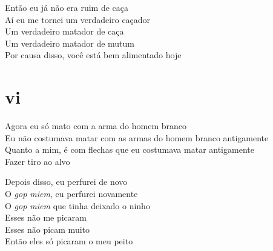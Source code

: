 \begin{linenumbers}\begingroup\raggedright
 
\noindent   Então eu já não era ruim de caça\\
  Aí eu me tornei um verdadeiro caçador\\
  Um verdadeiro matador de caça\\
  Um verdadeiro matador de mutum\\
  Por causa disso, você está bem alimentado hoje
 
 
\medskip
\section{vi}

  \noindent Agora eu só mato com a arma do homem branco\\
  Eu não costumava matar com as armas do homem branco antigamente\\
  Quanto a mim, é com flechas que eu costumava matar antigamente\\
  Fazer tiro ao alvo
 
\end{linenumbers}\endgroup

\bigskip

\begin{linenumbers}\begingroup\raggedright
 
\noindent   Depois disso, eu perfurei de novo\\
  O \emph{gop miem}, eu perfurei novamente\\
  O \emph{gop miem} que tinha deixado o ninho\\
  Esses não me picaram\\
  Esses não picam muito\\
  Então eles só picaram o meu peito
 
\end{linenumbers}\endgroup

